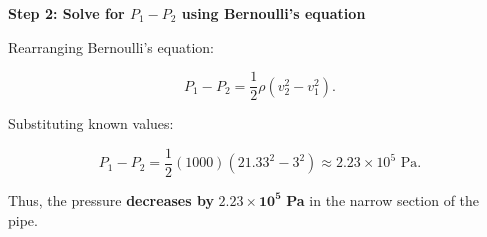 \begin{mdframed}[backgroundcolor=blue!10!white]
	
	\textbf{Step 2: Solve for \( P_1 - P_2 \) using Bernoulli’s equation}  
	
	Rearranging Bernoulli’s equation:
	
	\begin{equation*}
		P_1 - P_2 = \frac{1}{2} \rho \left(v_2^2 - v_1^2 \right).
	\end{equation*}
	
	Substituting known values:
	
	\begin{equation*}
		P_1 - P_2 = \frac{1}{2} (1000) \left( 21.33^2 - 3^2 \right) \approx 2.23 \times 10^5 \text{ Pa}.
	\end{equation*}
	
	Thus, the pressure \textbf{decreases by} \( \mathbf{2.23 \times 10^5} \) \textbf{Pa} in the narrow section of the pipe.
	

	
\end{mdframed}
\vspace{0.1in}

